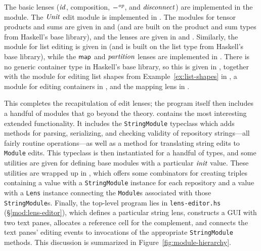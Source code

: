 The basic lenses ($\mathit{id}$, composition, $-^\mathit{op}$, and $\mathit{disconnect}$) are
implemented in the  module. The $\mathit{Unit}$
edit module is implemented in . The modules
for tensor products and sums are given in  and
 (and are built on the product and sum types from
Haskell's base library), and the lenses are given in
 and . Similarly,
the module for list editing is given in  (and is
built on the list type from Haskell's base library), while the $\mathsf{map}$ and
$\mathit{partition}$ lenses are implemented in . There
is no generic container type in Haskell's base library, so this is given in
, together with the module for editing list shapes
from Example~\ref{ex:list-shapes} in , a module
for editing containers in , and the mapping
lens in .

This completes the recapitulation of edit lenses; the program itself then
includes a handful of modules that go beyond the theory.
 contains the most interesting extended
functionality. It includes the \lstinline!StringModule! typeclass which adds
methods for parsing, serializing, and checking validity of repository
strings---all fairly routine operations---as well as a method for
translating string edits to \lstinline!Module! edits. This typeclass is then
instantiated for a handful of types, and some utilities are given for
defining base modules with a particular $\mathit{init}$ value. These utilities are
wrapped up in , which offers some combinators
for creating triples containing a value with a \lstinline!StringModule!
instance for each repository and a value with a \lstinline!Lens! instance
connecting the \lstinline!Module!s associated with those
\lstinline!StringModule!s. Finally, the top-level program lies in
\texttt{lens-editor.hs} (\S\ref{mod:lens-editor}), which defines a
particular string lens, constructs a GUI with two text panes, allocates a
reference cell for the complement, and connects the text panes' editing
events to invocations of the appropriate \lstinline!StringModule! methods.
This discussion is summarized in Figure~\ref{fig:module-hierarchy}.

